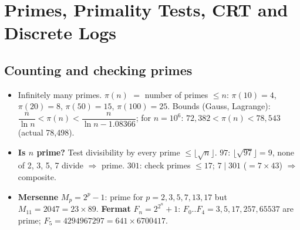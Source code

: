 \section{Primes, Primality Tests, CRT and Discrete Logs}

\subsection{Counting and checking primes}
\begin{itemize}
  \item Infinitely many primes. $\pi(n)$ $=$ number of primes $\le n$: $\pi(10) = 4$, $\pi(20) = 8$, $\pi(50) = 15$, $\pi(100) = 25$. Bounds (Gauss, Lagrange): $\dfrac{n}{\ln n} < \pi(n) < \dfrac{n}{\ln n - 1.08366}$; for $n = 10^6$: $72{,}382 < \pi(n) < 78{,}543$ (actual 78{,}498).
  \item \textbf{Is $n$ prime?} Test divisibility by every prime $\le \lfloor\sqrt n\rfloor$. $97$: $\lfloor\sqrt{97}\rfloor = 9$, none of 2, 3, 5, 7 divide $\Rightarrow$ prime. $301$: check primes $\le 17$; $7 \mid 301$ ($= 7 \times 43$) $\Rightarrow$ composite.
  \item \textbf{Mersenne} $M_p = 2^p - 1$: prime for $p = 2, 3, 5, 7, 13, 17$ but $M_{11} = 2047 = 23 \times 89$. \textbf{Fermat} $F_n = 2^{2^n} + 1$: $F_0..F_4 = 3, 5, 17, 257, 65537$ are prime; $F_5 = 4294967297 = 641 \times 6700417$.
\end{itemize}

